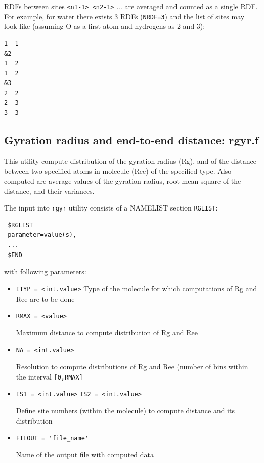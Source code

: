 \documentclass{article}
\begin{document}
RDFs between sites \verb|<n1-1> <n2-1>| ... are averaged and counted as a
single RDF. For example, for water there exists 3 RDFs (\verb|NRDF=3|) and
the list of sites may look like (assuming O as a first atom and hydrogens
as 2 and 3):

\begin{verbatim}
1  1
&2
1  2
1  2
&3
2  2
2  3
3  3
\end{verbatim}

\subsection{Gyration radius and end-to-end distance: rgyr.f}

This utility compute distribution of the gyration radius (Rg), and of the distance
between two specified atoms in molecule (Ree) of the specified type. Also computed are
average values of the gyration radius, root mean square of the distance, and their variances. 

The input into \verb|rgyr| utility consists of a NAMELIST section
\verb|RGLIST|:

\begin{verbatim}
 $RGLIST
 parameter=value(s),
 ...
 $END
\end{verbatim}

with following parameters:

\begin{itemize}

\item
\verb|ITYP = <int.value>|
Type of the molecule for which computations of Rg and Ree  are to be  done  
  
\item
\verb|RMAX = <value>|

Maximum distance to compute distribution of Rg and Ree 

\item
\verb|NA = <int.value>|

Resolution to compute distributions of Rg and Ree (number of bins within the 
interval \verb|[0,RMAX]|

\item
\verb|IS1 = <int.value>|  
\verb|IS2 = <int.value>|  

Define site numbers (within the molecule) to compute distance and its distribution 

\item
\verb|FILOUT = 'file_name'|

Name of the output file with computed data
\end{itemize}
\end{document}
